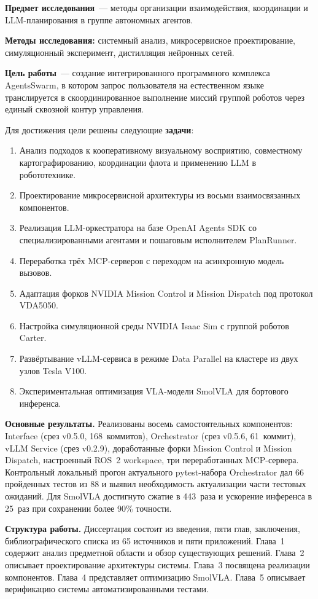 \documentclass[14pt,a4paper]{extreport}
\begin{document}
\textbf{Предмет исследования}~--- методы организации взаимодействия, координации и LLM-планирования в группе автономных агентов.

\textbf{Методы исследования:} системный анализ, микросервисное проектирование, симуляционный эксперимент, дистилляция нейронных сетей.

\textbf{Цель работы}~--- создание интегрированного программного комплекса AgentsSwarm, в котором запрос пользователя на естественном языке транслируется в скоординированное выполнение миссий группой роботов через единый сквозной контур управления.

Для достижения цели решены следующие \textbf{задачи}:
\begin{enumerate}
  \item Анализ подходов к кооперативному визуальному восприятию, совместному картографированию, координации флота и применению LLM в робототехнике.
  \item Проектирование микросервисной архитектуры из восьми взаимосвязанных компонентов.
  \item Реализация LLM-оркестратора на базе OpenAI Agents SDK со специализированными агентами и пошаговым исполнителем PlanRunner.
  \item Переработка трёх MCP-серверов с переходом на асинхронную модель вызовов.
  \item Адаптация форков NVIDIA Mission Control и Mission Dispatch под протокол VDA5050.
  \item Настройка симуляционной среды NVIDIA Isaac Sim с группой роботов Carter.
  \item Развёртывание vLLM-сервиса в режиме Data Parallel на кластере из двух узлов Tesla V100.
  \item Экспериментальная оптимизация VLA-модели SmolVLA для бортового инференса.
\end{enumerate}

\textbf{Основные результаты.} Реализованы восемь самостоятельных компонентов: Interface (срез v0.5.0, 168~коммитов), Orchestrator (срез v0.5.6, 61~коммит), vLLM Service (срез v0.2.9), доработанные форки Mission Control и Mission Dispatch, настроенный ROS~2 workspace, три переработанных MCP-сервера. Контрольный локальный прогон актуального pytest-набора Orchestrator дал 66 пройденных тестов из 88 и выявил необходимость актуализации части тестовых ожиданий. Для SmolVLA достигнуто сжатие в 443~раза и ускорение инференса в 25~раз при сохранении более 90\% точности.

\textbf{Структура работы.} Диссертация состоит из введения, пяти глав, заключения, библиографического списка из 65 источников и пяти приложений. Глава~1 содержит анализ предметной области и обзор существующих решений. Глава~2 описывает проектирование архитектуры системы. Глава~3 посвящена реализации компонентов. Глава~4 представляет оптимизацию SmolVLA. Глава~5 описывает верификацию системы автоматизированными тестами.
\end{document}
